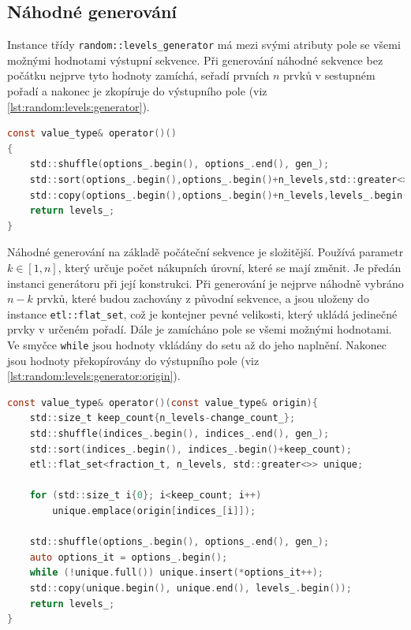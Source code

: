 \subsection{Náhodné generování}
Instance třídy \texttt{random::levels\_generator} má mezi svými atributy pole se všemi možnými hodnotami výstupní sekvence.
Při generování náhodné sekvence bez počátku nejprve tyto hodnoty zamíchá, seřadí prvních $n$ prvků v sestupném pořadí a nakonec je zkopíruje do výstupního pole (viz \ref{lst:random:levels:generator}).

\begin{lstlisting}[caption={~Metoda pro náhodné generování úrovní nákupu bez počátku},label={lst:random:levels:generator},captionpos=t,abovecaptionskip=-\medskipamount,belowcaptionskip=\medskipamount,language=C]
const value_type& operator()()
{
    std::shuffle(options_.begin(), options_.end(), gen_);
    std::sort(options_.begin(),options_.begin()+n_levels,std::greater<>());
    std::copy(options_.begin(),options_.begin()+n_levels,levels_.begin());
    return levels_;
}
\end{lstlisting}

Náhodné generování na základě počáteční sekvence je složitější.
Používá parametr $k \in [1, n] $, který určuje počet nákupních úrovní, které se mají změnit.
Je předán instanci generátoru při její konstrukci.
Při generování je nejprve náhodně vybráno $n-k$ prvků, které budou zachovány z původní sekvence, a jsou uloženy do instance \texttt{etl::flat\_set}, což je kontejner pevné velikosti, který ukládá jedinečné prvky v určeném pořadí.
Dále je zamícháno pole se všemi možnými hodnotami.
Ve smyčce \texttt{while} jsou hodnoty vkládány do setu až do jeho naplnění.
Nakonec jsou hodnoty překopírovány do výstupního pole (viz \ref{lst:random:levels:generator:origin}).
\pagebreak
\begin{lstlisting}[caption={~Metoda pro náhodné generování úrovní nákupu z počátku},label={lst:random:levels:generator:origin},captionpos=t,abovecaptionskip=-\medskipamount,belowcaptionskip=\medskipamount,language=C]
const value_type& operator()(const value_type& origin){
    std::size_t keep_count{n_levels-change_count_};
    std::shuffle(indices_.begin(), indices_.end(), gen_);
    std::sort(indices_.begin(), indices_.begin()+keep_count);
    etl::flat_set<fraction_t, n_levels, std::greater<>> unique;

    for (std::size_t i{0}; i<keep_count; i++)
        unique.emplace(origin[indices_[i]]);

    std::shuffle(options_.begin(), options_.end(), gen_);
    auto options_it = options_.begin();
    while (!unique.full()) unique.insert(*options_it++);
    std::copy(unique.begin(), unique.end(), levels_.begin());
    return levels_;
}
\end{lstlisting}

